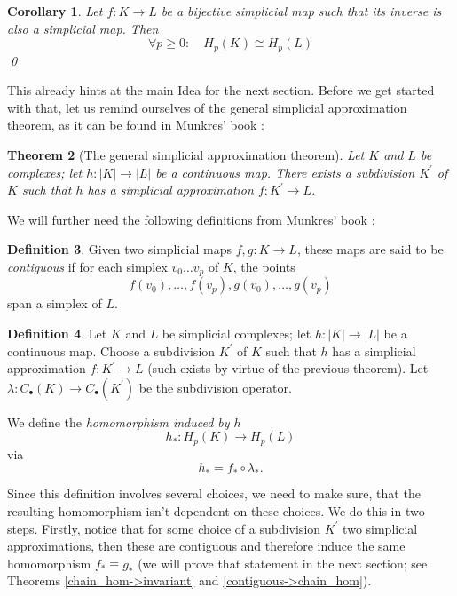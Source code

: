 \documentclass[toc=bib, headinclude]{scrartcl}
\theoremstyle{plain}
\newtheorem{theorem}{Theorem}[section]
\newtheorem{corollary}[theorem]{Corollary}
\theoremstyle{definition}
\newtheorem	{definition}[theorem]{Definition}
\theoremstyle{remark}
\newcommand{\isom}{\cong}
\begin{document}
\begin{corollary}\label{baby-case}
	Let $f: K\to L$ be a bijective simplicial map such that its inverse is also a simplicial map. Then \[
	\forall p\geq 0:\quad H_p(K)\isom H_p(L)
	\]\qed
\end{corollary}

This already hints at the main Idea for the next section. Before we get started with that,
let us remind ourselves of the general simplicial approximation theorem, as it can be found in Munkres' book \cite[Thm. 16.5, p. 95]{mu}:

\begin{theorem}[The general simplicial approximation theorem]
	Let $K$ and $L$ be complexes; let $h: |K|\to |L|$ be a continuous map. There exists a subdivision $K^\prime$ of $K$ such that $h$ has a simplicial approximation $f:K^\prime \to L$.
\end{theorem}
We will further need the following definitions from Munkres' book \cite[p. 67/p. 100]{mu}:
\begin{definition}%
	Given two simplicial maps $f,g: K\to L$, these maps are said to be \textit{contiguous} if for each simplex $v_0\dots v_p$ of $K$, the points \[
	f(v_0),\dots,f(v_p),g(v_0),\dots,g(v_p)
	\] span a simplex of $L$.
\end{definition}


\begin{definition}
	Let $K$ and $L$ be simplicial complexes; let $h:|K|\to |L|$ be a continuous map. Choose a subdivision $K^\prime$ of $K$ such that $h$ has a simplicial approximation $f:K^\prime\to L$ (such exists by virtue of the previous theorem). Let $\lambda:C_\bullet(K)\to C_\bullet(K^\prime)$ be the subdivision operator.
	
	 We define the \textit{homomorphism induced by $h$} 
	\[
	h_\ast: H_p(K)\to H_p(L)
	\]
	via
	\[
	h_\ast=f_\ast\circ \lambda_\ast.
	\]
\end{definition}


Since this definition involves several choices, we need to make sure, that the resulting homomorphism isn't dependent on these choices. We do this in two steps. Firstly, notice that for some choice of a subdivision $K^\prime$ two simplicial approximations, then these are contiguous and therefore induce the same homomorphism $f_\ast\equiv g_\ast$ (we will prove that statement in the next section; see Theorems \ref{chain_hom->invariant} and \ref{contiguous->chain_hom}).
\end{document}
